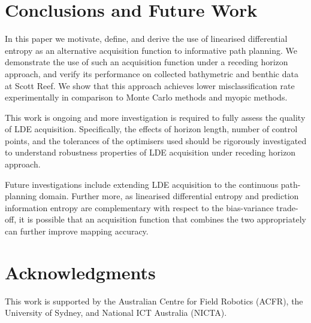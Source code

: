 \documentclass{article}
\begin{document}
\section{Conclusions and Future Work}
\label{Section:Conclusion}

	In this paper we motivate, define, and derive the use of linearised differential entropy as an alternative acquisition function to informative path planning. We demonstrate the use of such an acquisition function under a receding horizon approach, and verify its performance on collected bathymetric and benthic data at Scott Reef. We show that this approach achieves lower misclassification rate experimentally in comparison to Monte Carlo methods and myopic methods.
	
	This work is ongoing and more investigation is required to fully assess the quality of LDE acquisition. Specifically, the effects of horizon length, number of control points, and the tolerances of the optimisers used should be rigorously investigated to understand robustness properties of LDE acquisition under receding horizon approach.
	
	Future investigations include extending LDE acquisition to the continuous path-planning domain. Further more, as linearised differential entropy and prediction information entropy are complementary with respect to the bias-variance trade-off, it is possible that an acquisition function that combines the two appropriately can further improve mapping accuracy.
		
\section*{Acknowledgments}

	This work is supported by the Australian Centre for Field Robotics (ACFR), the University of Sydney, and National ICT Australia (NICTA).
	
%
%



\end{document}
